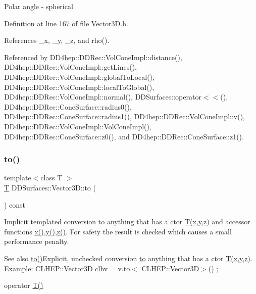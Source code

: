 Polar angle -\/ spherical 

Definition at line 167 of file Vector3\+D.\+h.



References \+\_\+x, \+\_\+y, \+\_\+z, and rho().



Referenced by D\+D4hep\+::\+D\+D\+Rec\+::\+Vol\+Cone\+Impl\+::distance(), D\+D4hep\+::\+D\+D\+Rec\+::\+Vol\+Cone\+Impl\+::get\+Lines(), D\+D4hep\+::\+D\+D\+Rec\+::\+Vol\+Cone\+Impl\+::global\+To\+Local(), D\+D4hep\+::\+D\+D\+Rec\+::\+Vol\+Cone\+Impl\+::local\+To\+Global(), D\+D4hep\+::\+D\+D\+Rec\+::\+Vol\+Cone\+Impl\+::normal(), D\+D\+Surfaces\+::operator$<$$<$(), D\+D4hep\+::\+D\+D\+Rec\+::\+Cone\+Surface\+::radius0(), D\+D4hep\+::\+D\+D\+Rec\+::\+Cone\+Surface\+::radius1(), D\+D4hep\+::\+D\+D\+Rec\+::\+Vol\+Cone\+Impl\+::v(), D\+D4hep\+::\+D\+D\+Rec\+::\+Vol\+Cone\+Impl\+::\+Vol\+Cone\+Impl(), D\+D4hep\+::\+D\+D\+Rec\+::\+Cone\+Surface\+::z0(), and D\+D4hep\+::\+D\+D\+Rec\+::\+Cone\+Surface\+::z1().

\hypertarget{class_d_d_surfaces_1_1_vector3_d_adca3092fab234dc0d929ef8c24b0eef6}{}\label{class_d_d_surfaces_1_1_vector3_d_adca3092fab234dc0d929ef8c24b0eef6} 
\subsubsection{\texorpdfstring{to()}{to()}}
{\footnotesize\ttfamily template$<$class T $>$ \\
\hyperlink{class_t}{T} D\+D\+Surfaces\+::\+Vector3\+D\+::to (\begin{DoxyParamCaption}{ }\end{DoxyParamCaption}) const\hspace{0.3cm}{\ttfamily [inline]}}

Implicit templated conversion to anything that has a c\textquotesingle{}tor \hyperlink{class_t}{T(x,y,z)} and accessor functions \hyperlink{class_d_d_surfaces_1_1_vector3_d_a42067b3c5580bcb067a91e27c0c99352}{x()},\hyperlink{class_d_d_surfaces_1_1_vector3_d_a0ff1549e1a9f987f22f84bc4e86605db}{y()},\hyperlink{class_d_d_surfaces_1_1_vector3_d_a3318b2914eff5012a878d22c373e9e08}{z()}. For safety the result is checked which causes a small performance penalty. \begin{DoxySeeAlso}{See also}
\hyperlink{class_d_d_surfaces_1_1_vector3_d_adca3092fab234dc0d929ef8c24b0eef6}{to()}Explicit, unchecked conversion \hyperlink{class_d_d_surfaces_1_1_vector3_d_adca3092fab234dc0d929ef8c24b0eef6}{to} anything that has a c\textquotesingle{}tor \hyperlink{class_t}{T(x,y,z)}. Example\+: C\+L\+H\+E\+P\+::\+Vector3D clhv = v.\+to$<$ C\+L\+H\+E\+P\+::\+Vector3\+D$>$() ; 

operator \hyperlink{class_t}{T()} 
\end{DoxySeeAlso}


